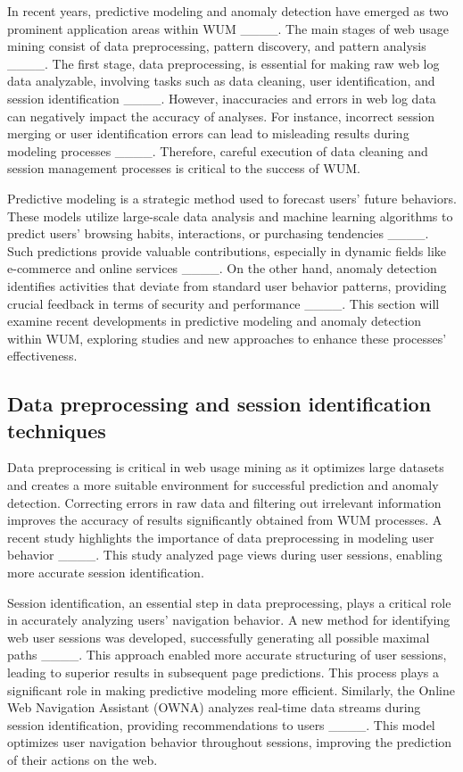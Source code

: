 In recent years, predictive modeling and anomaly detection have emerged as two prominent application areas within WUM ____. The main stages of web usage mining consist of data preprocessing, pattern discovery, and pattern analysis ____. The first stage, data preprocessing, is essential for making raw web log data analyzable, involving tasks such as data cleaning, user identification, and session identification ____. However, inaccuracies and errors in web log data can negatively impact the accuracy of analyses. For instance, incorrect session merging or user identification errors can lead to misleading results during modeling processes ____. Therefore, careful execution of data cleaning and session management processes is critical to the success of WUM.

Predictive modeling is a strategic method used to forecast users' future behaviors. These models utilize large-scale data analysis and machine learning algorithms to predict users' browsing habits, interactions, or purchasing tendencies ____. Such predictions provide valuable contributions, especially in dynamic fields like e-commerce and online services ____. On the other hand, anomaly detection identifies activities that deviate from standard user behavior patterns, providing crucial feedback in terms of security and performance ____. This section will examine recent developments in predictive modeling and anomaly detection within WUM, exploring studies and new approaches to enhance these processes' effectiveness.




\subsection{ Data preprocessing and session identification techniques}

Data preprocessing is critical in web usage mining as it optimizes large datasets and creates a more suitable environment for successful prediction and anomaly detection. Correcting errors in raw data and filtering out irrelevant information improves the accuracy of results significantly obtained from WUM processes. A recent study highlights the importance of data preprocessing in modeling user behavior ____. This study analyzed page views during user sessions, enabling more accurate session identification.

Session identification, an essential step in data preprocessing, plays a critical role in accurately analyzing users' navigation behavior. A new method for identifying web user sessions was developed, successfully generating all possible maximal paths ____. This approach enabled more accurate structuring of user sessions, leading to superior results in subsequent page predictions. This process plays a significant role in making predictive modeling more efficient. Similarly, the Online Web Navigation Assistant (OWNA) analyzes real-time data streams during session identification, providing recommendations to users ____. This model optimizes user navigation behavior throughout sessions, improving the prediction of their actions on the web.

